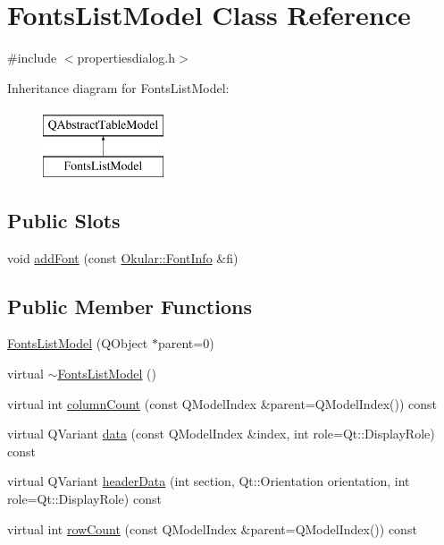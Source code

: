 \hypertarget{classFontsListModel}{\section{Fonts\+List\+Model Class Reference}
\label{classFontsListModel}
}


{\ttfamily \#include $<$propertiesdialog.\+h$>$}

Inheritance diagram for Fonts\+List\+Model\+:\begin{figure}[H]
\begin{center}
\leavevmode
\includegraphics[height=2.000000cm]{classFontsListModel}
\end{center}
\end{figure}
\subsection*{Public Slots}
\begin{DoxyCompactItemize}
\item 
void \hyperlink{classFontsListModel_a2670546d95737209b77c79324feea028}{add\+Font} (const \hyperlink{classOkular_1_1FontInfo}{Okular\+::\+Font\+Info} \&fi)
\end{DoxyCompactItemize}
\subsection*{Public Member Functions}
\begin{DoxyCompactItemize}
\item 
\hyperlink{classFontsListModel_a2e1e8e84983fd891c0bfc5bfdb6b3392}{Fonts\+List\+Model} (Q\+Object $\ast$parent=0)
\item 
virtual \hyperlink{classFontsListModel_a554f54bdfb5eb444316d3edf22a29d43}{$\sim$\+Fonts\+List\+Model} ()
\item 
virtual int \hyperlink{classFontsListModel_aee1d9b7ae167d2f74095d998e03f87cd}{column\+Count} (const Q\+Model\+Index \&parent=Q\+Model\+Index()) const 
\item 
virtual Q\+Variant \hyperlink{classFontsListModel_a97b705a88946fa223fd604af984605fd}{data} (const Q\+Model\+Index \&index, int role=Qt\+::\+Display\+Role) const 
\item 
virtual Q\+Variant \hyperlink{classFontsListModel_a047be31c5c7e992e67e0f123b56e8132}{header\+Data} (int section, Qt\+::\+Orientation orientation, int role=Qt\+::\+Display\+Role) const 
\item 
virtual int \hyperlink{classFontsListModel_a5623aa1d8535057bec49780226fddd85}{row\+Count} (const Q\+Model\+Index \&parent=Q\+Model\+Index()) const 
\end{DoxyCompactItemize}


